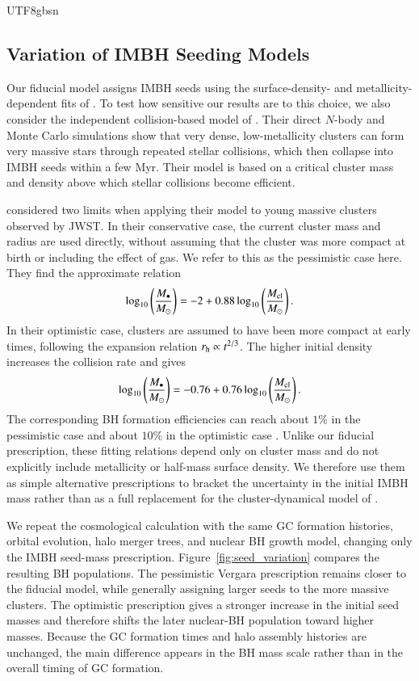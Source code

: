 \documentclass[trackchanges, twocolappendix, twocolumn]{aastex701}
\begin{document}
\begin{CJK*}{UTF8}{gbsn}
\subsection{Variation of IMBH Seeding Models} \label{subsect:IMBHmodels}

Our fiducial model assigns IMBH seeds using the surface-density- and metallicity-dependent fits of \cite{Rantala+2026FROST}. To test how sensitive our results are to this choice, we also consider the independent collision-based model of \cite{Vergara+2026IMBH}. Their direct $N$-body and Monte Carlo simulations show that very dense, low-metallicity clusters can form very massive stars through repeated stellar collisions, which then collapse into IMBH seeds within a few Myr. Their model is based on a critical cluster mass and density above which stellar collisions become efficient.

\cite{Vergara+2026IMBH} considered two limits when applying their model to young massive clusters observed by JWST. In their conservative case, the current cluster mass and radius are used directly, without assuming that the cluster was more compact at birth or including the effect of gas. We refer to this as the pessimistic case here. They find the approximate relation
\begin{align}
\log_{10}\left(\dfrac{M_\bullet}{M_\odot}\right)
=
-2
+
0.88\log_{10}\left(\dfrac{M_{\rm cl}}{M_\odot}\right).
\end{align}
In their optimistic case, clusters are assumed to have been more compact at early times, following the expansion relation $r_{\rm h}\propto t^{2/3}$. The higher initial density increases the collision rate and gives
\begin{align}
\log_{10}\left(\dfrac{M_\bullet}{M_\odot}\right)
=
-0.76
+
0.76\log_{10}\left(\dfrac{M_{\rm cl}}{M_\odot}\right).
\end{align}
The corresponding BH formation efficiencies can reach about $1\%$ in the pessimistic case and about $10\%$ in the optimistic case \citep{Vergara+2026IMBH}. Unlike our fiducial prescription, these fitting relations depend only on cluster mass and do not explicitly include metallicity or half-mass surface density. We therefore use them as simple alternative prescriptions to bracket the uncertainty in the initial IMBH mass rather than as a full replacement for the cluster-dynamical model of \cite{Vergara+2026IMBH}.

We repeat the cosmological calculation with the same GC formation histories, orbital evolution, halo merger trees, and nuclear BH growth model, changing only the IMBH seed-mass prescription. Figure~\ref{fig:seed_variation} compares the resulting BH populations. The pessimistic Vergara prescription remains closer to the fiducial model, while generally assigning larger seeds to the more massive clusters. The optimistic prescription gives a stronger increase in the initial seed masses and therefore shifts the later nuclear-BH population toward higher masses. Because the GC formation times and halo assembly histories are unchanged, the main difference appears in the BH mass scale rather than in the overall timing of GC formation.


\end{CJK*}
\end{document}
